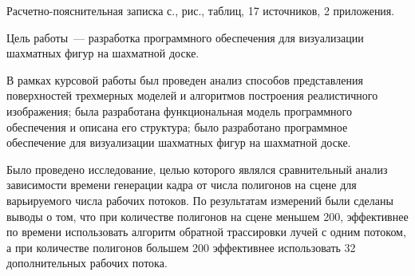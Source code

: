 

Расчетно-пояснительная записка \pageref{LastPage} с., \totalfigures{} рис., \totaltables{} таблиц, 17 источников, 2 приложения.


Цель работы~--- разработка программного обеспечения для визуализации шахматных фигур на шахматной доске.

В рамках курсовой работы был проведен анализ способов представления поверхностей трехмерных моделей и алгоритмов построения реалистичного изображения; была разработана функциональная модель программного обеспечения и описана его структура; было разработано программное обеспечение для визуализации шахматных фигур на шахматной доске.

Было проведено исследование, целью которого являлся сравнительный анализ зависимости времени генерации кадра от числа полигонов на сцене для варьируемого числа рабочих потоков. По результатам измерений были сделаны выводы о том, что при количестве полигонов на сцене меньшем 200, эффективнее по времени использовать алгоритм обратной трассировки лучей с одним потоком, а при  количестве полигонов большем 200 эффективнее использовать 32 дополнительных рабочих потока.

%
%
%
%
